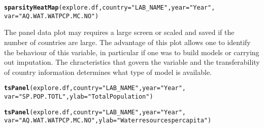 \documentclass{article}\usepackage{graphicx, color}
\makeatletter
\newcommand{\hlfunctioncall}[1]{\textcolor[rgb]{0.501960784313725,0,0.329411764705882}{\textbf{#1}}}%
\newcommand{\hlstring}[1]{\textcolor[rgb]{0.6,0.6,1}{#1}}%
\newenvironment{kframe}{%
 \def\at@end@of@kframe{}%
 \ifinner\ifhmode%
  \def\at@end@of@kframe{\end{minipage}}%
  \begin{minipage}{\columnwidth}%
 \fi\fi%
 \def\FrameCommand##1{\hskip\@totalleftmargin \hskip-\fboxsep
 \colorbox{shadecolor}{##1}\hskip-\fboxsep
     \hskip-\linewidth \hskip-\@totalleftmargin \hskip\columnwidth}%
 \MakeFramed {\advance\hsize-\width
   \@totalleftmargin\z@ \linewidth\hsize
   \@setminipage}}%
 {\par\unskip\endMakeFramed%
 \at@end@of@kframe}
\newenvironment{knitrout}{}{} %
\makeatother
\begin{document}
\clearpage
\begin{knitrout}
\color{fgcolor}\begin{kframe}
\begin{alltt}
\hlfunctioncall{sparsityHeatMap}(explore.df, country = \hlstring{"LAB_NAME"}, year = \hlstring{"Year"},
                var = \hlstring{"AQ.WAT.WATPCP.MC.NO"})
\end{alltt}


{\ttfamily\noindent\bfseries\color{errorcolor}{\#\# Error: could not find function "sparsityHeatMap"}}\end{kframe}
\end{knitrout}


\clearpage
The panel data plot may requires a large screen or scaled and saved if
the number of countries are large. The advantage of this plot allows one
to identify the behaviour of this variable, in particular if one was to
build models or carrying out imputation. The chracteristics that govern
the variable and the transferability of country information determines
what type of model is available.

\begin{knitrout}
\color{fgcolor}\begin{kframe}
\begin{alltt}
\hlfunctioncall{tsPanel}(explore.df, country = \hlstring{"LAB_NAME"}, year = \hlstring{"Year"},
        var = \hlstring{"SP.POP.TOTL"}, ylab = \hlstring{"Total Population"})
\end{alltt}


{\ttfamily\noindent\bfseries\color{errorcolor}{\#\# Error: object 'explore.df' not found}}\end{kframe}
\end{knitrout}



\begin{knitrout}
\color{fgcolor}\begin{kframe}
\begin{alltt}
\hlfunctioncall{tsPanel}(explore.df, country = \hlstring{"LAB_NAME"}, year = \hlstring{"Year"},
        var = \hlstring{"AQ.WAT.WATPCP.MC.NO"}, ylab = \hlstring{"Water resources per capita"})
\end{alltt}


{\ttfamily\noindent\bfseries\color{errorcolor}{\#\# Error: object 'explore.df' not found}}\end{kframe}
\end{knitrout}
\end{document}
